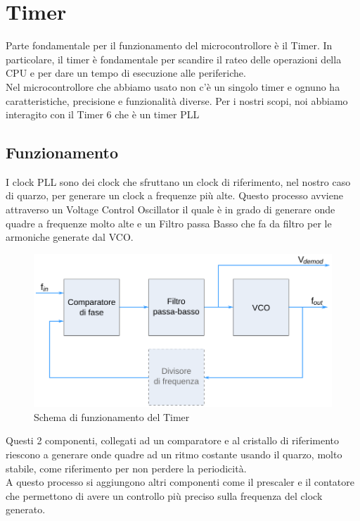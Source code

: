\pagebreak
\section{Timer}
Parte fondamentale per il funzionamento del microcontrollore è il Timer. In particolare, il timer è fondamentale per scandire il rateo delle operazioni della CPU e per dare un tempo di esecuzione alle periferiche.\\

Nel microcontrollore che abbiamo usato non c'è un singolo timer e ognuno ha caratteristiche, precisione e funzionalità diverse. 
Per i nostri scopi, noi abbiamo interagito con il Timer 6 che è un timer PLL

\subsection{Funzionamento}
I clock PLL sono dei clock che sfruttano un clock di riferimento, nel nostro caso di quarzo, per generare un clock a frequenze più alte. Questo processo avviene attraverso un Voltage Control Oscillator il quale è in grado di generare onde quadre a frequenze molto alte e un
Filtro passa Basso che fa da filtro per le armoniche generate dal VCO.\\

\begin{figure}[h]
    \centering
    \includegraphics[width=0.7\linewidth]{microcontrollore/assets/PLL1_it.png}
    \caption{Schema di funzionamento del Timer}
    \label{fig:Timer}
\end{figure}

Questi 2 componenti, collegati ad un comparatore e al cristallo di riferimento riescono a generare onde quadre ad un ritmo costante usando il quarzo, molto stabile, come riferimento per non perdere la periodicità.\\
A questo processo si aggiungono altri componenti come il prescaler e il contatore che permettono di avere un controllo più preciso sulla frequenza del clock generato.\\

